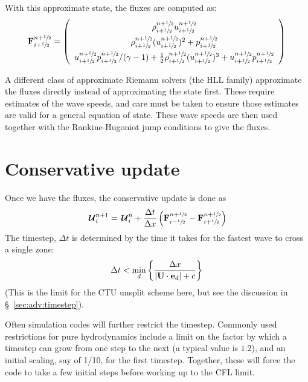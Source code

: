With this approximate state, the fluxes are computed as:
\begin{equation}
\renewcommand{\arraystretch}{1.5}
\Fb_{i+\myhalf}^{n+\myhalf} = \left ( \begin{array}{c}
                             \rho_{i+\myhalf}^{n+\myhalf} u_{i+\myhalf}^{n+\myhalf} \\
                             \rho_{i+\myhalf}^{n+\myhalf} (u_{i+\myhalf}^{n+\myhalf})^2 + p_{i+\myhalf}^{n+\myhalf} \\
                             u_{i+\myhalf}^{n+\myhalf} p_{i+\myhalf}^{n+\myhalf} / (\gamma - 1)  +
                             \frac{1}{2} \rho_{i+\myhalf}^{n+\myhalf} (u_{i+\myhalf}^{n+\myhalf})^3 +
                             u_{i+\myhalf}^{n+\myhalf} p_{i+\myhalf}^{n+\myhalf}
                            \end{array} \right )
\renewcommand{\arraystretch}{1.0}
\end{equation}

A different class of approximate Riemann solvers (the HLL family)
approximate the fluxes directly instead of approximating the state
first.  These require estimates of the wave speeds, and care must be
taken to ensure those estimates are valid for a general equation of
state.  These wave speeds are then used together with the
Rankine-Hugoniot jump conditions to give the fluxes.


\section{Conservative update}

Once we have the fluxes, the conservative update is done as
\begin{equation}
{\,\boldsymbol{\mathcal{U}}}^{n+1}_i = {\,\boldsymbol{\mathcal{U}}}^n_i + \frac{\Delta t}{\Delta x} 
   \left ( {\bf F}_{i-{\sfrac{1}{2}}}^{n+{\sfrac{1}{2}}} - {\bf F}_{i+{\sfrac{1}{2}}}^{n+{\sfrac{1}{2}}} \right )
\end{equation}
The timestep, $\Delta t$ is determined by the time it takes for the
fastest wave to cross a single zone:
\begin{equation}
\Delta t < \min_d \left \{ \frac{\Delta x}{|{\bf U} \cdot {\bf e}_d| + c}\right \}
\end{equation}
(This is the limit for the CTU unsplit scheme here, but see the discussion
in \S~\ref{sec:adv:timestep}).

Often simulation codes will further restrict the timestep.  Commonly
used restrictions for pure hydrodynamics include a limit on the factor
by which a timestep can grow from one step to the next (a typical
value is $1.2$), and an initial scaling, say of 1/10, for the first
timestep.  Together, these will force the code to take a few initial
steps before working up to the CFL limit.

